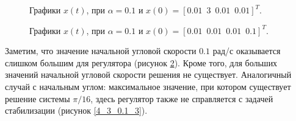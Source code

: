 \begin{figure}[!h]
\caption{Графики $x(t)$, при $\alpha = 0.1$ и $x(0) = [0.01\, \, \,  3\, \, \, 0.01\, \, \, 0.01]^T$.}
\label{4_3_0.1_1}
\end{figure}


\begin{figure}[!h]
\caption{Графики $x(t)$, при $\alpha = 0.1$ и $x(0) = [0.01\, \, \,  0.01\, \, \, 0.01\, \, \, 0.1]^T$.}
\label{4_3_0.1_2}
\end{figure}

Заметим, что значение начальной угловой скорости $0.1$ рад/с оказывается слишком большим для регулятора (рисунок \ref{4_3_0.1_2}). Кроме того, для больших значений начальной угловой скорости решения не существует. Аналогичный случай с начальным углом: максимальное значение, при котором существует решение системы $\pi /16$, здесь регулятор также не справляется с задачей стабилизации (рисунок \ref{4_3_0.1_3}).

